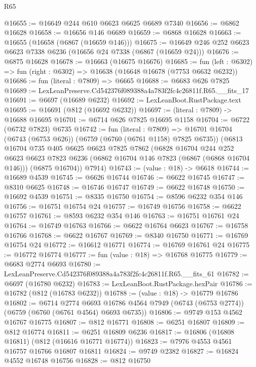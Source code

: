 \begin{lexlean}{R65}
\begin{coremodule}
{@16655 := @16649 @244 @610 @6623 @6625 @6689 @7340
@16656 := @6862 @16628
@16658 := @16656 @146 @6689
@16659 := @6868 @16628
@16663 := @16655 (@16658 (@6867 (@16659 @146)))
@16675 := @16649 @246 @252 @6623 @6623 @7338 @6236 (@16656 @24 @7338 (@6867 (@16659 @24)))
@16676 := @6875 @16628
@16678 := @16663 (@16675 @16676)
@16685 := fun (left : @6302) => fun (right : @6302) => @16638 (@16648 @16678 (@7753 @6632 @6232))
@16686 := fun (literal : @7809) => @6665
@16688 := @6683 @626 @7825
@16689 := LexLeanPreserve.Cd542376f089388a4a783f2fc4c26811f.R65.__fits_17
@16691 := @6697 (@16689 @6232)
@16692 := LexLeanBoot.RustPackage.text
@16695 := @16691 (@812 (@16692 @6232))
@16697 := (literal : @7809) -> @16688 @16695
@16701 := @6714 @626 @7825 @16695 @1158
@16704 := @6722 (@6732 @7823) @6735
@16742 := fun (literal : @7809) =>
  @16701
    @16704
    (@6743 (@6753 @626))
    (@6759 (@6760 (@6761 @1158) @7825 @6735))
    (@6813
      @16704
      @735
      @405
      @6625
      @6623
      @7825
      @7862
      (@6828
        @16704
        @244
        @252
        @6623
        @6623
        @7823
        @6236
        (@6862 @16704 @146 @7823 (@6867 (@6868 @16704 @146)))
        (@6875 @16704))
      @7914)
@16743 := (value : @18) -> @6618
@16744 := @16689 @4539
@16745 := @6626 @16744
@16746 := @6622 @16745
@16747 := @8310 @6625
@16748 := @16746 @16747
@16749 := @6622 @16748
@16750 := @16692 @4539
@16751 := @8335 @16750
@16754 := @8596 @6232 @354 @146
@16756 := @16751 @16754 @24
@16757 := @16749 @16756
@16758 := @6622 @16757
@16761 := @8593 @6232 @354 @146
@16763 := @16751 @16761 @24
@16764 := @16749 @16763
@16766 := @6622 @16764 @6623
@16767 := @16758 @16766
@16768 := @6622 @16767
@16769 := @8340 @16750
@16771 := @16769 @16754 @24
@16772 := @16612 @16771
@16774 := @16769 @16761 @24
@16775 := @16772 @16774
@16777 := fun (value : @18) => @16768 @16775
@16779 := @6683 @2774 @6693
@16780 := LexLeanPreserve.Cd542376f089388a4a783f2fc4c26811f.R65.__fits_61
@16782 := @6697 (@16780 @6232)
@16783 := LexLeanBoot.RustPackage.hexPair
@16786 := @16782 (@812 (@16783 @6232))
@16788 := (value : @18) -> @16779 @16786
@16802 := @6714
    @2774
    @6693
    @16786
    @4564
    @7949
    (@6743 (@6753 @2774))
    (@6759 (@6760 (@6761 @4564) @6693 @6735))
@16806 := @9749 @153 @4562 @16767 @16775
@16807 := @812 @16771
@16808 := @6251 @16807
@16809 := @812 @16774
@16811 := @6251 @16809 @6236
@16817 := @16806 (@16808 @16811) (@812 (@16616 @16771 @16774))
@16823 := @7976 @4553 @4561 @16757 @16766 @16807 @16811
@16824 := @9749 @2382
@16827 := @16824 @4552 @16748 @16756
@16828 := @812 @16750
}
\end{coremodule}
\end{lexlean}
